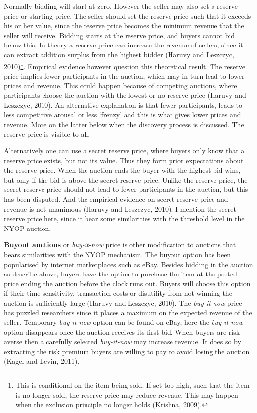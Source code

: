 \documentclass[a4paper,12pt]{article}
\begin{document}
	Normally bidding will start at zero. However the seller may also set a reserve price or starting price. The seller should set the reserve price such that it exceeds his or her value, since the reserve price becomes the minimum revenue that the seller will receive. Bidding starts at the reserve price, and buyers cannot bid below this. In theory a reserve price can increase the revenue of sellers, since it can extract addition surplus from the highest bidder (Haruvy and Leszczyc, 2010)\footnote{This is conditional on the item being sold. If set too high, such that the item is no longer sold, the reserve price may reduce revenue. This may happen when the exclusion principle no longer holds (Krishna, 2009).}. Empirical evidence however question this theoretical result. The reserve price implies fewer participants in the auction, which may in turn lead to lower prices and revenue. This could happen because of competing auctions, where participants choose the auction with the lowest or no reserve price (Haruvy and Leszczyc, 2010). An alternative explanation is that fewer participants, leads to less competitive arousal or less `frenzy' and this is what gives lower prices and revenue. More on the latter below when the discovery process is discussed. The reserve price is visible to all. 

	Alternatively one can use a secret reserve price, where buyers only know that a reserve price exists, but not its value. Thus they form prior expectations about the reserve price. When the auction ends the buyer with the highest bid wins, but only if the bid is above the secret reserve price. Unlike the reserve price, the secret reserve price should not lead to fewer participants in the auction, but this has been disputed. And the empirical evidence on secret reserve price and revenue is not unanimous (Haruvy and Leszczyc, 2010). I mention the secret reserve price here, since it bear some similarities with the threshold level in the NYOP auction.

	{\bf Buyout auctions} or {\it buy-it-now} price is other modification to auctions that bears similarities with the NYOP mechanism. The buyout option has been popularised by internet marketplaces such as eBay. Besides bidding in the auction as describe above, buyers have the option to purchase the item at the posted price ending the auction before the clock runs out. Buyers will choose this option if their time-sensitivity, transaction costs or disutility from not winning the auction is sufficiently large (Haruvy and Leszczyc, 2010). The {\it buy-it-now} price has puzzled researchers since it places a maximum on the expected revenue of the seller. Temporary {\it buy-it-now} option can be found on eBay, here the {\it buy-it-now} option disappears once the auction receives its first bid. When buyers are risk averse then a carefully selected {\it buy-it-now} may increase revenue. It does so by extracting the risk premium buyers are willing to pay to avoid losing the auction (Kagel and Levin, 2011).
\end{document}
